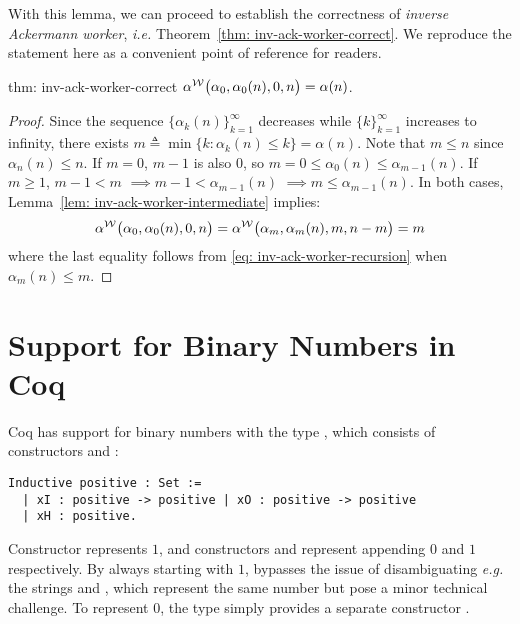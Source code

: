 With this lemma, we can proceed to establish the correctness of \emph{inverse Ackermann worker}, \emph{i.e.} Theorem~\ref{thm: inv-ack-worker-correct}. We reproduce the statement here as a convenient point of reference for readers.

\begin{usethmcounterof}{thm: inv-ack-worker-correct}
	$\alpha^{\mathcal{W}}\big(\alpha_0, \alpha_0(n), 0, n\big) = \alpha(n)$.
\end{usethmcounterof}

\begin{proof}
	Since the sequence $\big\{\alpha_k(n)\big\}_{k=1}^{\infty}$ decreases while $\{k\}_{k=1}^{\infty}$ increases to infinity, there exists $m \triangleq \min\big\{k : \alpha_k(n) \le k \} = \alpha(n)$. Note that $m\le n$ since $\alpha_n(n)\le n$.
	If $m = 0$, $m - 1$ is also $0$, so $m = 0 \le \alpha_0(n)\le \alpha_{m-1}(n)$. If $m \ge 1$, $m - 1 < m$ $\implies m - 1 < \alpha_{m-1}(n)$ $\implies m \le \alpha_{m-1}(n)$. In both cases, Lemma~\ref{lem: inv-ack-worker-intermediate} implies:
	$$ \alpha^{\mathcal{W}}\big(\alpha_0, \alpha_0(n), 0, n\big) = \alpha^{\mathcal{W}}\big(\alpha_m, \alpha_m(n), m, n - m\big) = m $$
	where the last equality follows from \eqref{eq: inv-ack-worker-recursion} when $\alpha_m(n)\le m$.
\end{proof}

\section{Support for Binary Numbers in Coq}
\label{apx:bin_in_coq}
Coq has support for binary numbers with the type , which consists 
of constructors  and :

\begin{lstlisting}
Inductive positive : Set := 
  | xI : positive -> positive | xO : positive -> positive
  | xH : positive.
\end{lstlisting}

Constructor  represents $1$, and constructors  and  represent 
appending $0$ and $1$ respectively. 
By always starting with $1$,  bypasses
the issue of disambiguating \emph{e.g.} the strings  and 
, which represent the same number but pose
a minor technical challenge. 
To represent $0$, the type  simply provides a separate constructor . 


